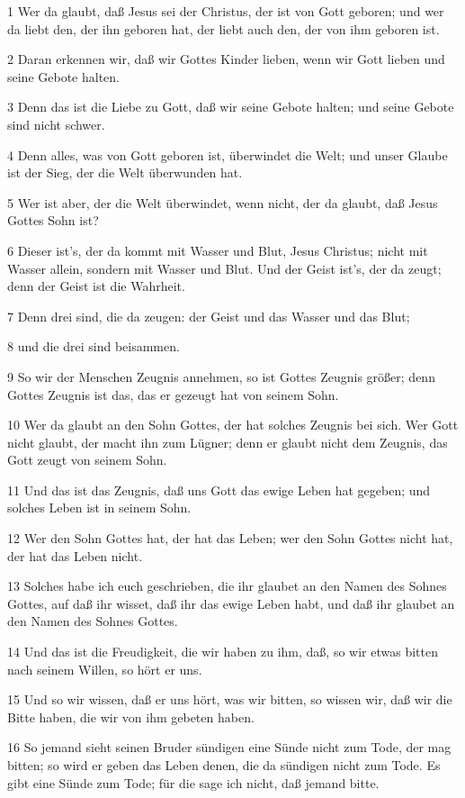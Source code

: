 \par 1 Wer da glaubt, daß Jesus sei der Christus, der ist von Gott geboren; und wer da liebt den, der ihn geboren hat, der liebt auch den, der von ihm geboren ist.
\par 2 Daran erkennen wir, daß wir Gottes Kinder lieben, wenn wir Gott lieben und seine Gebote halten.
\par 3 Denn das ist die Liebe zu Gott, daß wir seine Gebote halten; und seine Gebote sind nicht schwer.
\par 4 Denn alles, was von Gott geboren ist, überwindet die Welt; und unser Glaube ist der Sieg, der die Welt überwunden hat.
\par 5 Wer ist aber, der die Welt überwindet, wenn nicht, der da glaubt, daß Jesus Gottes Sohn ist?
\par 6 Dieser ist's, der da kommt mit Wasser und Blut, Jesus Christus; nicht mit Wasser allein, sondern mit Wasser und Blut. Und der Geist ist's, der da zeugt; denn der Geist ist die Wahrheit.
\par 7 Denn drei sind, die da zeugen: der Geist und das Wasser und das Blut;
\par 8 und die drei sind beisammen.
\par 9 So wir der Menschen Zeugnis annehmen, so ist Gottes Zeugnis größer; denn Gottes Zeugnis ist das, das er gezeugt hat von seinem Sohn.
\par 10 Wer da glaubt an den Sohn Gottes, der hat solches Zeugnis bei sich. Wer Gott nicht glaubt, der macht ihn zum Lügner; denn er glaubt nicht dem Zeugnis, das Gott zeugt von seinem Sohn.
\par 11 Und das ist das Zeugnis, daß uns Gott das ewige Leben hat gegeben; und solches Leben ist in seinem Sohn.
\par 12 Wer den Sohn Gottes hat, der hat das Leben; wer den Sohn Gottes nicht hat, der hat das Leben nicht.
\par 13 Solches habe ich euch geschrieben, die ihr glaubet an den Namen des Sohnes Gottes, auf daß ihr wisset, daß ihr das ewige Leben habt, und daß ihr glaubet an den Namen des Sohnes Gottes.
\par 14 Und das ist die Freudigkeit, die wir haben zu ihm, daß, so wir etwas bitten nach seinem Willen, so hört er uns.
\par 15 Und so wir wissen, daß er uns hört, was wir bitten, so wissen wir, daß wir die Bitte haben, die wir von ihm gebeten haben.
\par 16 So jemand sieht seinen Bruder sündigen eine Sünde nicht zum Tode, der mag bitten; so wird er geben das Leben denen, die da sündigen nicht zum Tode. Es gibt eine Sünde zum Tode; für die sage ich nicht, daß jemand bitte.
